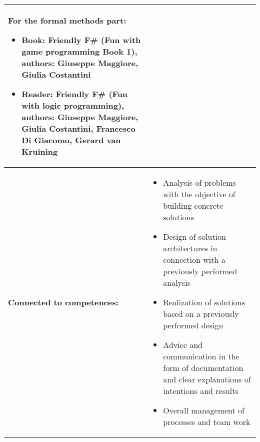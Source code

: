 \begin{tabularx}{\textwidth}{|>{\columncolor{lichtGrijs}} p{}|X|}
		For the formal methods part:
		\begin{itemize}
			\item Book: Friendly F\# (Fun with game programming Book 1), authors: Giuseppe Maggiore, Giulia Costantini
			\item Reader: Friendly F\# (Fun with logic programming), authors: Giuseppe Maggiore, Giulia Costantini, Francesco Di Giacomo, Gerard van Kruining
		\end{itemize} \\
	\hline
	\textbf{Connected to \newline competences:} &
		\begin{itemize}
			\item Analysis of problems with the objective of building concrete solutions
			\item Design of solution architectures in connection with a previously performed analysis
			\item Realization of solutions based on a previously performed design
			\item Advice and communication in the form of documentation and clear explanations of intentions and results
			\item Overall management of processes and team work
		\end{itemize}				
		 \\
	\hline
\end{tabularx}
\newpage

